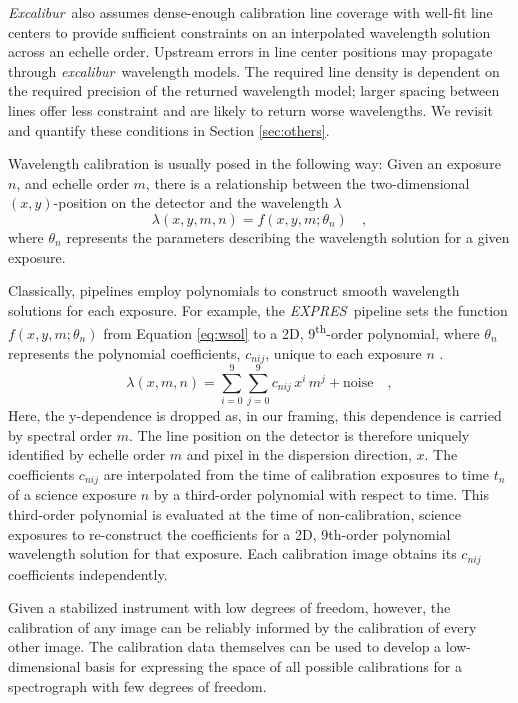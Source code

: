 \documentclass[twocolumn,table,xcolor,trackchanges]{aastex63}
\newcommand{\project}[1]{\textsl{#1}}
\newcommand{\name}{\project{excalibur}}
\newcommand{\Name}{\project{Excalibur}}
\newcommand{\acronym}[1]{{\small{#1}}}
\newcommand{\expres}{\project{\acronym{EXPRES}}}
\begin{document}
\Name\ also assumes dense-enough calibration line coverage with well-fit line centers to provide sufficient constraints on an interpolated wavelength solution across an echelle order.  Upstream errors in line center positions may propagate through \name\ wavelength models.  The required line density is dependent on the required precision of the returned wavelength model; larger spacing between lines offer less constraint and are likely to return worse wavelengths.  We revisit and quantify these conditions in Section \ref{sec:others}.

Wavelength calibration is usually posed in the following way: Given an exposure $n$, and echelle order $m$, there is a relationship between
the two-dimensional $(x,y)$-position on the detector and the
wavelength $\lambda$
\begin{equation}
\lambda(x,y,m,n) = f(x,y,m;\theta_{n})
\quad ,
\label{eq:wsol}
\end{equation}
where $\theta_{n}$ represents the parameters describing the wavelength solution for a given exposure.

Classically, pipelines employ polynomials to construct smooth wavelength solutions for each exposure.  For example, the \expres\ pipeline sets the function $f(x,y,m;\theta_{n})$ from Equation \ref{eq:wsol} to a 2D, 9\textsuperscript{th}-order polynomial, where $\theta_{n}$ represents the polynomial coefficients, $c_{nij}$, unique to each exposure $n$ \citep{petersburg2020}.
\begin{equation}
\lambda(x,m,n) = \sum_{i=0}^9\sum_{j=0}^9 c_{nij}\, x^i\,m^j + \mathrm{noise}
\quad ,
\label{eq:poly_wsol}
\end{equation}
Here, the y-dependence is dropped as, in our framing, this dependence is carried by spectral order $m$.  The line position on the detector is therefore uniquely identified by echelle order $m$ and pixel in the dispersion direction, $x$.  The coefficients $c_{nij}$ are interpolated from the time of calibration exposures to time $t_n$ of a science exposure $n$ by a third-order polynomial with respect to time.  This third-order polynomial is evaluated at the time of non-calibration, science exposures to re-construct the coefficients for a 2D, 9th-order polynomial wavelength solution for that exposure.  Each calibration image obtains its $c_{nij}$ coefficients independently.

Given a stabilized instrument with low degrees of freedom, however, the calibration of any image can be reliably informed by the calibration of every other image.  The calibration data themselves can be used to develop a low-dimensional basis for expressing the space of all possible calibrations for a spectrograph with few degrees of freedom.
\end{document}
